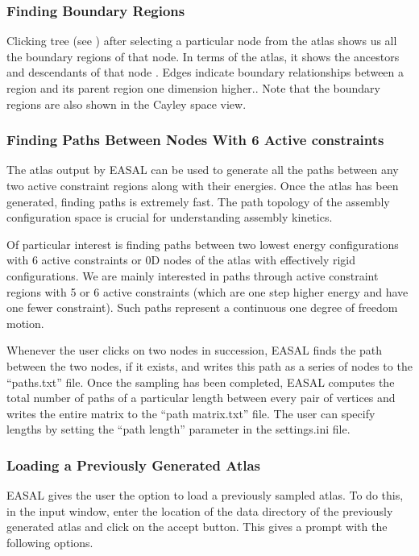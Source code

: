 \documentclass[10pt]{article}
\begin{document}
\subsubsection{Finding Boundary Regions}
Clicking tree (see ) after selecting a particular node from
the atlas shows us all the boundary regions of that node. In terms of the
atlas, it shows the ancestors and descendants of that node . Edges indicate
boundary relationships between a region and its parent region one dimension
higher.. Note that the boundary regions are also shown in the Cayley space
view.



\subsubsection{Finding Paths Between Nodes With 6 Active constraints}
The atlas output by EASAL can be used to generate all the paths between any two
active constraint regions along with their energies. Once the atlas has been
generated, finding paths is extremely fast. The path topology of the assembly
configuration space is crucial for understanding assembly kinetics.

Of particular interest is finding paths between two lowest energy
configurations with 6 active constraints or 0D nodes of the atlas with
effectively rigid configurations. We are mainly interested in paths through
active constraint regions with 5 or 6 active constraints (which are one step
higher energy and have one fewer constraint). Such paths represent a continuous
one degree of freedom motion.

Whenever the user clicks on two nodes in succession, EASAL finds the path
between the two nodes, if it exists, and writes this path as a series of nodes
to the “paths.txt” file. Once the sampling has been completed, EASAL computes
the total number of paths of a particular length between every pair of vertices
and writes the entire matrix to the “path matrix.txt” file. The user can
specify lengths by setting the “path length” parameter in the settings.ini
file.


\subsubsection{Loading a Previously Generated Atlas}
\label{sec:loadAtlas}
EASAL gives the user the option to load a previously sampled atlas. To do this,
in the input window, enter the location of the data directory of the previously
generated atlas and click on the accept button. This gives a prompt with the
following options.
\end{document}
